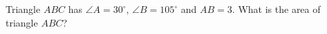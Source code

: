Triangle $ABC$ has $\angle A=30^\circ$, $\angle B=105^\circ$ and $AB=3$. What is the area of triangle $ABC$?
